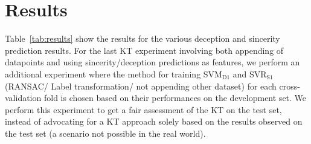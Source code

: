 \documentclass{article}
\begin{document}



\section{Results}
Table~\ref{tab:results} show the results for the various deception and sincerity prediction results. 
For the last KT experiment involving both appending of datapoints and using sincerity/deception predictions as features, we perform an additional experiment where the method for training SVM$_\text{D1}$ and SVR$_\text{S1}$ (RANSAC/ Label transformation/ not appending other dataset) for each cross-validation fold is chosen based on their performances on the development set. 
We perform this experiment to get a fair assessment of the KT on the test set, instead of advocating for a KT approach solely based on the results observed on the test set (a scenario not possible in the real world).
\end{document}
